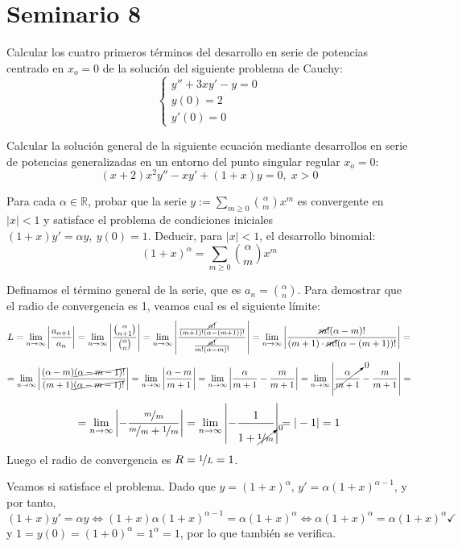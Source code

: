 \section{Seminario 8}
\begin{ejer}[\textbf{53}.a] Calcular los cuatro primeros términos del desarrollo en serie de potencias centrado
    en $x_o = 0$ de la solución del siguiente problema de Cauchy:
    $$\left\{ \begin{array}{l}
     y'' + 3xy' - y = 0 \\
     y(0) = 2 \\
     y'(0) = 0
\end{array}\right.$$
\end{ejer}
\begin{ejer}[\textbf{54}.a] Calcular la solución general de la siguiente ecuación mediante desarrollos en serie de potencias generalizadas en un entorno del punto singular regular $x_o = 0$:
$$(x + 2)x^2y'' - xy' + (1 + x)y = 0, \;  x > 0$$
\end{ejer}
\begin{ejer}[\textbf{55}] Para cada $\alpha \in  \mathbb R$, probar que la serie $y := \sum_{m\geq 0}{\alpha \choose m} x^m$ es convergente en $|x| < 1$ y satisface el problema de condiciones iniciales $(1 + x)y' = \alpha y, \: y(0) = 1$. Deducir, para $|x| < 1$, el desarrollo binomial:
    $$(1+x)^{\alpha}= \sum_{m\geq 0}{\alpha \choose m} x^m$$
\end{ejer}
\begin{sol}
    Definamos el término general de la serie, que es $a_n={\alpha \choose n}$.
    Para demostrar que el radio de convergencia es 1, veamos cual es el siguiente límite:
    $$L=\lim_{n \to \infty} \left|\dfrac{a_{n+1}}{a_n}\right|=\lim_{n \to \infty} \left|\dfrac{{\alpha \choose n+1}}{{\alpha \choose n}}\right|=\lim_{n \to \infty} \left|\dfrac{\frac{\cancel{\alpha!}}{(m+1)!(\alpha-(m+1))!}}{\frac{\cancel{\alpha!}}{m!(\alpha-m)!}}\right|=\lim_{n \to \infty} \left|\dfrac{\cancel{m!}(\alpha-m)!}{(m+1)\cdot \cancel{m!}(\alpha-(m+1))!}\right|= $$
    $$=\lim_{n \to \infty} \left|\dfrac{(\alpha-m)\cancel{(\alpha-m-1)!}}{(m+1)\cancel{(\alpha-m-1)!}}\right|=\lim_{n \to \infty} \left|\dfrac{\alpha-m}{m+1}\right| =\lim_{n \to \infty} \left|\dfrac{\alpha}{m+1}-\dfrac{m}{m+1}\right|=\lim_{n \to \infty} \left|\cancelto{0}{\dfrac{\alpha}{m+1}}- \dfrac{m}{m+1}\right|= $$
    $$=\lim_{n \to \infty}\left|-\dfrac{\nicefrac{m}{m}}{\nicefrac{m}{m}+\nicefrac{1}{m}}\right|=\lim_{n \to \infty}\left|- \dfrac{1}{1+\cancelto{0}{\nicefrac{1}{m}}}\right|=|-1|=1$$
    Luego el radio de convergencia es $R=\nicefrac{1}{L}=1$. 
        
    Veamos si satisface el problema. Dado que $y=(1+x)^{\alpha}$, $y'=\alpha(1+x)^{\alpha-1}$, y por tanto, 
    $$(1 + x)y' = \alpha y \iff (1+x)\alpha(1+x)^{\alpha-1}=\alpha (1+x)^{\alpha} \iff \alpha (1+x)^{\alpha}=\alpha (1+x)^{\alpha} \checkmark $$
    y $1=y(0)=(1+0)^{\alpha}=1^{\alpha}=1$, por lo que también se verifica. 
\end{sol}

